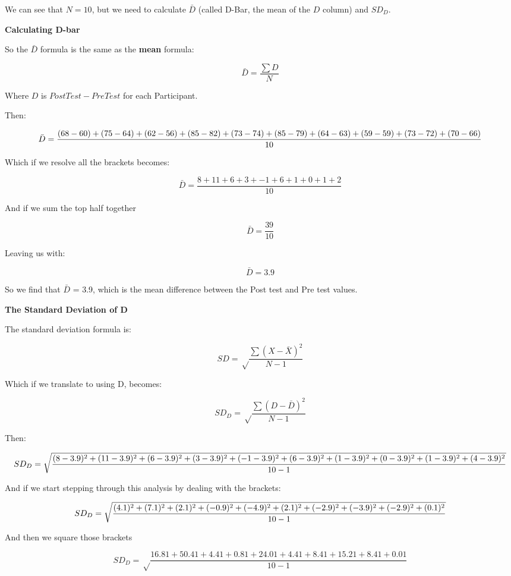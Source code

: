 \documentclass[
  oneside]{book}
\begin{document}
We can see that \(N = 10\), but we need to calculate \(\bar{D}\) (called D-Bar, the mean of the \(D\) column) and \(SD_{D}\).

\textbf{Calculating D-bar}

So the \(\bar{D}\) formula is the same as the \textbf{mean} formula:

\[\bar{D} = \frac{\sum{D}}{N}\]

Where \(D\) is \(PostTest - PreTest\) for each Participant.

Then:

\[\bar{D} = \frac{(68 - 60) + (75 - 64) + (62 - 56) + (85 - 82) + (73 - 74) + \\ (85- 79) + (64 - 63) + (59 - 59) + (73 - 72) + (70 - 66)}{10}\]

Which if we resolve all the brackets becomes:

\[\bar{D} = \frac{8 + 11 + 6 + 3 + -1 + 6 + 1 + 0 + 1 + 2}{10}\]

And if we sum the top half together

\[\bar{D} = \frac{39}{10}\]

Leaving us with:

\[\bar{D} = 3.9\]

So we find that \(\bar{D}\) = 3.9, which is the mean difference between the Post test and Pre test values.

\textbf{The Standard Deviation of D}

The standard deviation formula is:

\[SD = \sqrt\frac{\sum(X - \bar{X})^2}{N-1}\]

Which if we translate to using D, becomes:

\[SD_{D} = \sqrt\frac{\sum(D - \bar{D})^2}{N-1}\]

Then:

\[SD_{D} =\sqrt\frac{(8 - 3.9)^2 + (11 - 3.9)^2 + (6 - 3.9)^2 + (3 - 3.9)^2 + (-1 - 3.9)^2 + \\ (6 - 3.9)^2 + (1 - 3.9)^2 + (0 - 3.9)^2 + (1 - 3.9)^2 + (4 - 3.9)^2}{10 - 1}\]

And if we start stepping through this analysis by dealing with the brackets:

\[SD_{D} =\sqrt\frac{(4.1)^2 + (7.1)^2 + (2.1)^2 + (-0.9)^2 + (-4.9)^2 + \\ (2.1)^2 + (-2.9)^2 + (-3.9)^2 + (-2.9)^2 + (0.1)^2}{10 - 1}\]

And then we square those brackets

\[SD_{D} =\sqrt\frac{16.81 + 50.41 + 4.41 + 0.81 + 24.01 + 4.41 + 8.41 + 15.21 + 8.41 + 0.01}{10 - 1}\]
\end{document}
